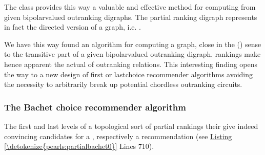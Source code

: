 \documentclass[a4paper,12pt,english]{sphinxhowto}
\begin{document}
\sphinxAtStartPar
The  class provides this way a valuable and effective method for computing  from given bipolar\sphinxhyphen{}valued outranking digraphs. The partial  ranking digraph represents in fact the directed version of a  graph, i.e.  .

\begin{sphinxVerbatim}[commandchars=\\\{\},numbers=left,firstnumber=1,stepnumber=1]
  
\end{sphinxVerbatim}

\sphinxAtStartPar
We have this way found an algorithm for computing a  graph, close in the {\hyperref[\detokenize{pearls:ordinalcorrelation-tutorial-label}]{}} () sense to the transitive part of a given bipolar\sphinxhyphen{}valued outranking digraph.  rankings make hence apparent the actual  of outranking relations. This interesting finding opens the way to a new design of first\sphinxhyphen{} or last\sphinxhyphen{}choice recommender algorithms avoiding the necessity to arbitrarily break up potential chordless outranking circuits.


\subsubsection{The Bachet choice recommender algorithm}
\label{\detokenize{pearls:the-bachet-choice-recommender-algorithm}}\label{\detokenize{pearls:bachet-choice-recommender-tutorial-label}}
\sphinxAtStartPar
The first and last levels of a topological sort of partial rankings \textendash{}their \textendash{} give indeed convincing candidates for a , respectively a  recommendation (see \hyperref[\detokenize{pearls:partialbachet0}]{Listing \ref{\detokenize{pearls:partialbachet0}}} Lines 7\sphinxhyphen{}10).
\end{document}
